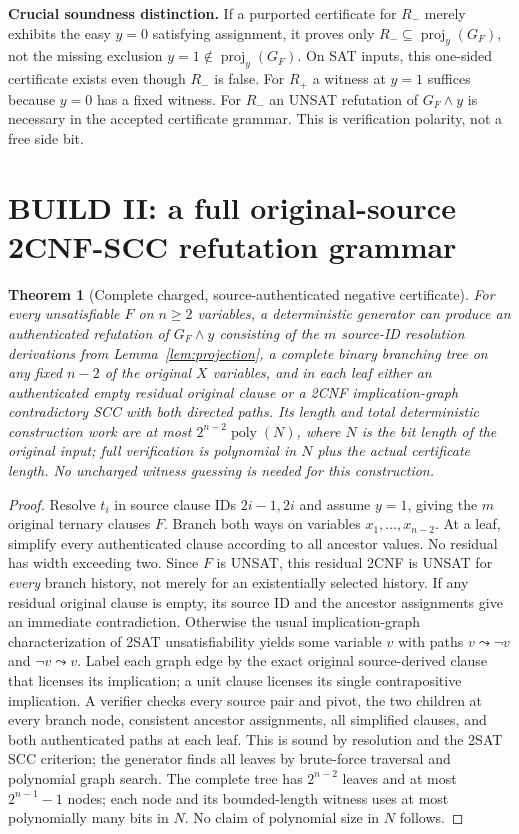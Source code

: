 \documentclass[11pt]{article}
\newtheorem{theorem}{Theorem}
\newcommand{\proj}{\operatorname{proj}}
\begin{document}
\noindent\textbf{Crucial soundness distinction.} If a purported certificate for $R_-$ merely exhibits the easy $y=0$ satisfying assignment, it proves only $R_-\subseteq\proj_y(G_F)$, not the missing exclusion $y=1\notin\proj_y(G_F)$. On SAT inputs, this one-sided certificate exists even though $R_-$ is false. For $R_+$ a witness at $y=1$ suffices because $y=0$ has a fixed witness. For $R_-$ an UNSAT refutation of $G_F\wedge y$ is necessary in the accepted certificate grammar. This is verification polarity, not a free side bit.

\section{BUILD II: a full original-source 2CNF-SCC refutation grammar}
\begin{theorem}[Complete charged, source-authenticated negative certificate]\label{thm:tree}
For every unsatisfiable $F$ on $n\ge2$ variables, a deterministic generator can produce an authenticated refutation of $G_F\wedge y$ consisting of the $m$ source-ID resolution derivations from Lemma~\ref{lem:projection}, a complete binary branching tree on any fixed $n-2$ of the original $X$ variables, and in each leaf either an authenticated empty residual original clause or a 2CNF implication-graph contradictory SCC with both directed paths. Its length and total deterministic construction work are at most $2^{n-2}\operatorname{poly}(N)$, where $N$ is the bit length of the original input; full verification is polynomial in $N$ plus the \emph{actual certificate length}. No uncharged witness guessing is needed for this construction.
\end{theorem}
\begin{proof}
Resolve $t_i$ in source clause IDs $2i-1,2i$ and assume $y=1$, giving the $m$ original ternary clauses $F$. Branch both ways on variables $x_1,\ldots,x_{n-2}$. At a leaf, simplify every authenticated clause according to all ancestor values. No residual has width exceeding two. Since $F$ is UNSAT, this residual 2CNF is UNSAT for \emph{every} branch history, not merely for an existentially selected history. If any residual original clause is empty, its source ID and the ancestor assignments give an immediate contradiction. Otherwise the usual implication-graph characterization of 2SAT unsatisfiability yields some variable $v$ with paths $v\leadsto\neg v$ and $\neg v\leadsto v$. Label each graph edge by the exact original source-derived clause that licenses its implication; a unit clause licenses its single contrapositive implication. A verifier checks every source pair and pivot, the two children at every branch node, consistent ancestor assignments, all simplified clauses, and both authenticated paths at each leaf. This is sound by resolution and the 2SAT SCC criterion; the generator finds all leaves by brute-force traversal and polynomial graph search. The complete tree has $2^{n-2}$ leaves and at most $2^{n-1}-1$ nodes; each node and its bounded-length witness uses at most polynomially many bits in $N$. No claim of polynomial size in $N$ follows.
\end{proof}
\end{document}
